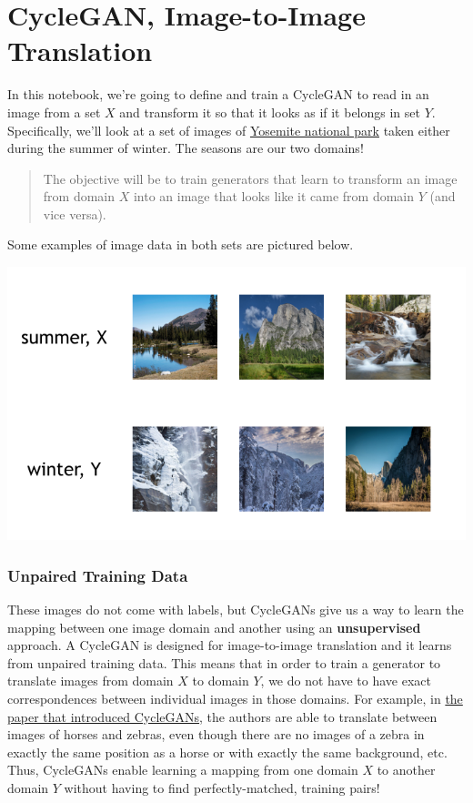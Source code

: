 \section{CycleGAN, Image-to-Image Translation}

In this notebook, we're going to define and train a CycleGAN to read in
an image from a set \(X\) and transform it so that it looks as if it
belongs in set \(Y\). Specifically, we'll look at a set of images of
\href{https://en.wikipedia.org/wiki/Yosemite_National_Park}{Yosemite
national park} taken either during the summer of winter. The seasons are
our two domains!

\begin{quote}
The objective will be to train generators that learn to transform an
image from domain \(X\) into an image that looks like it came from
domain \(Y\) (and vice versa).
\end{quote}

Some examples of image data in both sets are pictured below.

\includegraphics[width=1\linewidth]{img//genAdvNet//image2image/XY_season_images.png}

\subsubsection{Unpaired Training Data}

These images do not come with labels, but CycleGANs give us a way to
learn the mapping between one image domain and another using an
\textbf{unsupervised} approach. A CycleGAN is designed for
image-to-image translation and it learns from unpaired training data.
This means that in order to train a generator to translate images from
domain \(X\) to domain \(Y\), we do not have to have exact
correspondences between individual images in those domains. For example,
in \href{https://arxiv.org/abs/1703.10593}{the paper that introduced
CycleGANs}, the authors are able to translate between images of horses
and zebras, even though there are no images of a zebra in exactly the
same position as a horse or with exactly the same background, etc. Thus,
CycleGANs enable learning a mapping from one domain \(X\) to another
domain \(Y\) without having to find perfectly-matched, training pairs!

